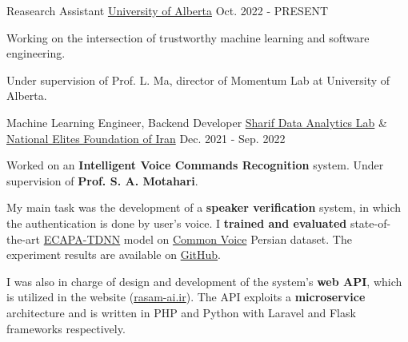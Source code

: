 

\begin{cventries}

  \cventry
    {Reasearch Assistant} %
    {\href{https://www.ualberta.ca/index.html}{University of Alberta}} %
    {} %
    {Oct. 2022 - PRESENT} %
    {
      \begin{cvitems} %
        \item {Working on the intersection of trustworthy machine learning and software engineering.}
        \item {Under supervision of Prof. L. Ma, director of Momentum Lab at University of Alberta.}
      \end{cvitems}
    }

  \cventry
    {Machine Learning Engineer, Backend Developer} %
    {\href{https://www.sharif.edu/}{Sharif Data Analytics Lab} \& \href{https://en.bmn.ir/}{National Elites Foundation of Iran}} %
    {} %
    {Dec. 2021 - Sep. 2022} %
    {
      \begin{cvitems} %
        \item {Worked on an \textbf{Intelligent Voice Commands Recognition} system. Under supervision of \textbf{Prof. S. A. Motahari}.}
        \item {My main task was the development of a \textbf{speaker verification} system, in which the authentication is done by user's voice. I \textbf{trained and evaluated} state-of-the-art \href{https://arxiv.org/abs/2005.07143}{ECAPA-TDNN} model on \href{https://commonvoice.mozilla.org}{Common Voice} Persian dataset. The experiment results are available on \href{https://github.com/radinshayanfar/speaker-verification}{GitHub}.}
        \item{I was also in charge of design and development of the system's \textbf{web API}, which is utilized in the website (\href{https://rasam-ai.ir/}{rasam-ai.ir}). The API exploits a \textbf{microservice} architecture and is written in PHP and Python with Laravel and Flask frameworks respectively.}
      \end{cvitems}
    }


\end{cventries}
